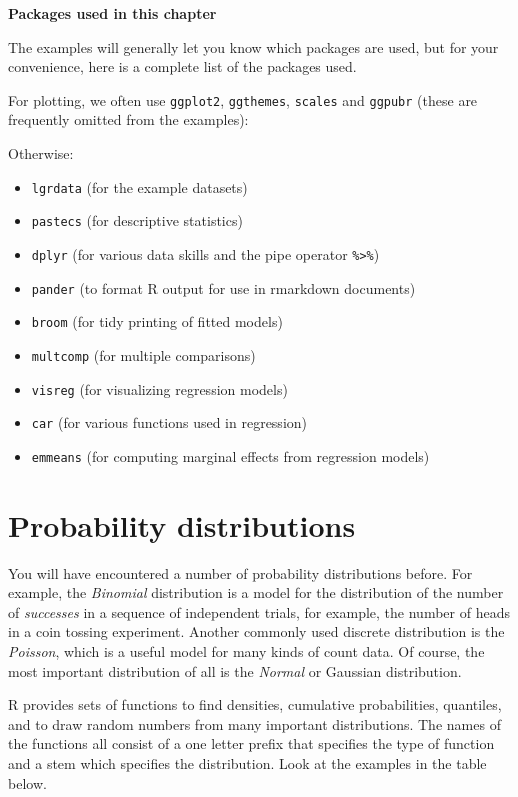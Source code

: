 \documentclass[]{book}
\providecommand{\tightlist}{%
  \setlength{\itemsep}{0pt}\setlength{\parskip}{0pt}}
\begin{document}
\textbf{Packages used in this chapter}

The examples will generally let you know which packages are used, but for your convenience, here is a complete list of the packages used.

For plotting, we often use \texttt{ggplot2}, \texttt{ggthemes}, \texttt{scales} and \texttt{ggpubr} (these are frequently omitted from the examples):

Otherwise:

\begin{itemize}
\tightlist
\item
  \texttt{lgrdata} (for the example datasets)
\item
  \texttt{pastecs} (for descriptive statistics)
\item
  \texttt{dplyr} (for various data skills and the pipe operator \texttt{\%\textgreater{}\%})
\item
  \texttt{pander} (to format R output for use in rmarkdown documents)
\item
  \texttt{broom} (for tidy printing of fitted models)
\item
  \texttt{multcomp} (for multiple comparisons)
\item
  \texttt{visreg} (for visualizing regression models)
\item
  \texttt{car} (for various functions used in regression)
\item
  \texttt{emmeans} (for computing marginal effects from regression models)
\end{itemize}

\hypertarget{distributions}{%
\section{Probability distributions}\label{distributions}}

You will have encountered a number of probability distributions before. For example, the \emph{Binomial} distribution is a model for the distribution of the number of \emph{successes} in a sequence of independent trials, for example, the number of heads in a coin tossing experiment. Another commonly used discrete distribution is the \emph{Poisson}, which is a useful model for many kinds of count data. Of course, the most important distribution of all is the \emph{Normal} or Gaussian distribution.

R provides sets of functions to find densities, cumulative probabilities, quantiles, and to draw random numbers from many important distributions. The names of the functions all consist of a one letter prefix that specifies the type of function and a stem which specifies the distribution. Look at the examples in the table below.
\end{document}
